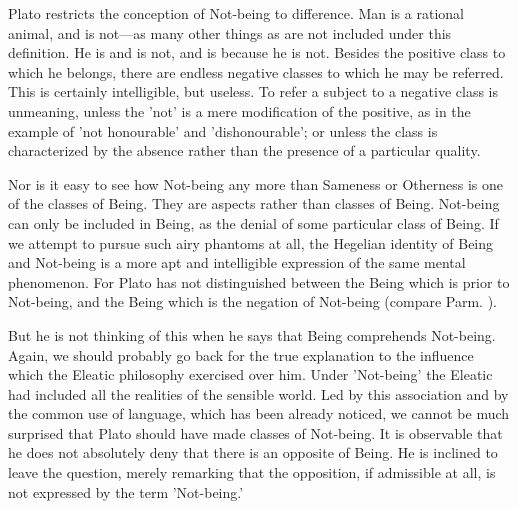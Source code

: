\documentclass[11pt,letter]{article}
\begin{document}
\par  Plato restricts the conception of Not-being to difference. Man is a rational animal, and is not—as many other things as are not included under this definition. He is and is not, and is because he is not. Besides the positive class to which he belongs, there are endless negative classes to which he may be referred. This is certainly intelligible, but useless. To refer a subject to a negative class is unmeaning, unless the 'not' is a mere modification of the positive, as in the example of 'not honourable' and 'dishonourable'; or unless the class is characterized by the absence rather than the presence of a particular quality.

\par  Nor is it easy to see how Not-being any more than Sameness or Otherness is one of the classes of Being. They are aspects rather than classes of Being. Not-being can only be included in Being, as the denial of some particular class of Being. If we attempt to pursue such airy phantoms at all, the Hegelian identity of Being and Not-being is a more apt and intelligible expression of the same mental phenomenon. For Plato has not distinguished between the Being which is prior to Not-being, and the Being which is the negation of Not-being (compare Parm. ).

\par  But he is not thinking of this when he says that Being comprehends Not-being. Again, we should probably go back for the true explanation to the influence which the Eleatic philosophy exercised over him. Under 'Not-being' the Eleatic had included all the realities of the sensible world. Led by this association and by the common use of language, which has been already noticed, we cannot be much surprised that Plato should have made classes of Not-being. It is observable that he does not absolutely deny that there is an opposite of Being. He is inclined to leave the question, merely remarking that the opposition, if admissible at all, is not expressed by the term 'Not-being.'
\end{document}
